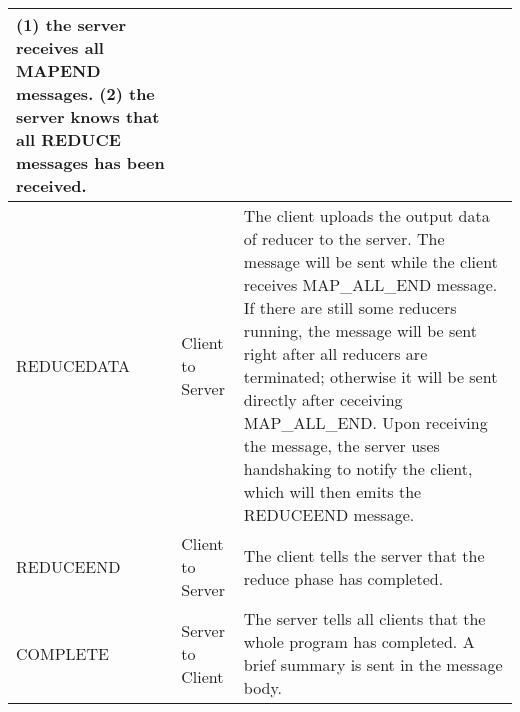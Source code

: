 \begin{center}
\begin{tabular}{| l | l | p{7.5cm} |}
(1) the server receives all MAPEND messages. \newline
(2) the server knows that all REDUCE messages has been received. \\
\hline
REDUCEDATA & Client to Server & The client uploads the output data of reducer to the server. \newline
The message will be sent while the client receives MAP\_ALL\_END message. If there are still some reducers running, the message will be sent right after all reducers are terminated; otherwise it will be sent directly after ceceiving MAP\_ALL\_END. \newline
Upon receiving the message, the server uses handshaking to notify the client, which will then emits the REDUCEEND message. \\
\hline
REDUCEEND & Client to Server & The client tells the server that the reduce phase has completed. \\
\hline
COMPLETE & Server to Client & The server tells all clients that the whole program has completed. A brief summary is sent in the message body. \\
\hline

\end{tabular}

\end{center}